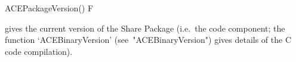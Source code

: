 \>ACEPackageVersion() F

gives the current version of the {\ACE} Share Package (i.e.~the {\GAP}
code      component;       the       function       `ACEBinaryVersion'
(see~"ACEBinaryVersion") gives details of the C code compilation).

